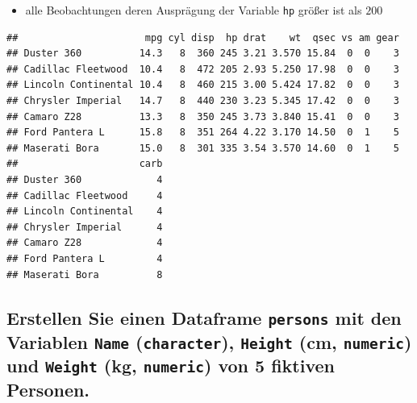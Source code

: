 \documentclass[12pt,a4paper]{article}
\newenvironment{Shaded}{\begin{snugshade}}{\end{snugshade}}
\newcommand{\DecValTok}[1]{\textcolor[rgb]{0.00,0.00,0.81}{#1}}
\newcommand{\NormalTok}[1]{#1}
\newcommand{\SpecialCharTok}[1]{\textcolor[rgb]{0.81,0.36,0.00}{\textbf{#1}}}
\begin{document}
\begin{itemize}
  \item alle Beobachtungen deren Ausprägung der Variable \texttt{hp} größer ist als $200$
\end{itemize}

\begin{Shaded}
\end{Shaded}

\begin{verbatim}
##                      mpg cyl disp  hp drat    wt  qsec vs am gear
## Duster 360          14.3   8  360 245 3.21 3.570 15.84  0  0    3
## Cadillac Fleetwood  10.4   8  472 205 2.93 5.250 17.98  0  0    3
## Lincoln Continental 10.4   8  460 215 3.00 5.424 17.82  0  0    3
## Chrysler Imperial   14.7   8  440 230 3.23 5.345 17.42  0  0    3
## Camaro Z28          13.3   8  350 245 3.73 3.840 15.41  0  0    3
## Ford Pantera L      15.8   8  351 264 4.22 3.170 14.50  0  1    5
## Maserati Bora       15.0   8  301 335 3.54 3.570 14.60  0  1    5
##                     carb
## Duster 360             4
## Cadillac Fleetwood     4
## Lincoln Continental    4
## Chrysler Imperial      4
## Camaro Z28             4
## Ford Pantera L         4
## Maserati Bora          8
\end{verbatim}

\hypertarget{erstellen-sie-einen-dataframe-persons-mit-den-variablen-name-character-height-cm-numeric-und-weight-kg-numeric-von-5-fiktiven-personen.}{%
\subsection{\texorpdfstring{Erstellen Sie einen Dataframe
\texttt{persons} mit den Variablen \texttt{Name} (\texttt{character}),
\texttt{Height} (cm, \texttt{numeric}) und \texttt{Weight} (kg,
\texttt{numeric}) von 5 fiktiven
Personen.}{Erstellen Sie einen Dataframe persons mit den Variablen Name (character), Height (cm, numeric) und Weight (kg, numeric) von 5 fiktiven Personen.}}\label{erstellen-sie-einen-dataframe-persons-mit-den-variablen-name-character-height-cm-numeric-und-weight-kg-numeric-von-5-fiktiven-personen.}}
\end{document}
